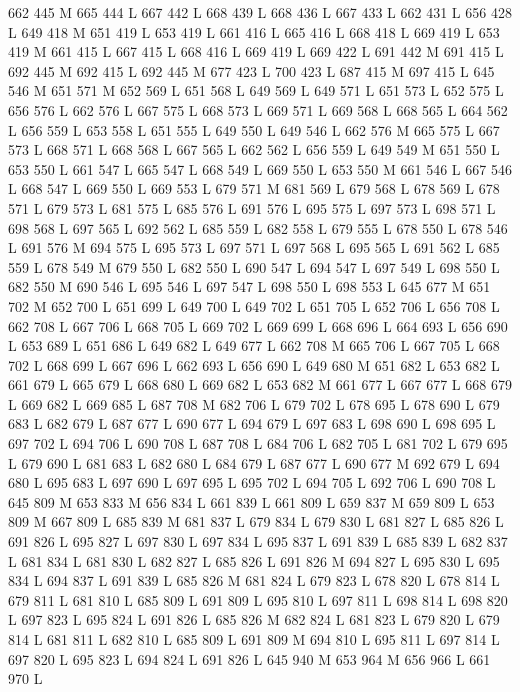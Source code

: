 {{{{{{{{{{{{{{{{{{{{{{{{662 445 M 665 444 L
667 442 L
668 439 L
668 436 L
667 433 L
662 431 L
656 428 L
649 418 M 651 419 L
653 419 L
661 416 L
665 416 L
668 418 L
669 419 L
653 419 M 661 415 L
667 415 L
668 416 L
669 419 L
669 422 L
691 442 M 691 415 L
692 445 M 692 415 L
692 445 M 677 423 L
700 423 L
687 415 M 697 415 L
645 546 M 651 571 M 652 569 L
651 568 L
649 569 L
649 571 L
651 573 L
652 575 L
656 576 L
662 576 L
667 575 L
668 573 L
669 571 L
669 568 L
668 565 L
664 562 L
656 559 L
653 558 L
651 555 L
649 550 L
649 546 L
662 576 M 665 575 L
667 573 L
668 571 L
668 568 L
667 565 L
662 562 L
656 559 L
649 549 M 651 550 L
653 550 L
661 547 L
665 547 L
668 549 L
669 550 L
653 550 M 661 546 L
667 546 L
668 547 L
669 550 L
669 553 L
679 571 M 681 569 L
679 568 L
678 569 L
678 571 L
679 573 L
681 575 L
685 576 L
691 576 L
695 575 L
697 573 L
698 571 L
698 568 L
697 565 L
692 562 L
685 559 L
682 558 L
679 555 L
678 550 L
678 546 L
691 576 M 694 575 L
695 573 L
697 571 L
697 568 L
695 565 L
691 562 L
685 559 L
678 549 M 679 550 L
682 550 L
690 547 L
694 547 L
697 549 L
698 550 L
682 550 M 690 546 L
695 546 L
697 547 L
698 550 L
698 553 L
645 677 M 651 702 M 652 700 L
651 699 L
649 700 L
649 702 L
651 705 L
652 706 L
656 708 L
662 708 L
667 706 L
668 705 L
669 702 L
669 699 L
668 696 L
664 693 L
656 690 L
653 689 L
651 686 L
649 682 L
649 677 L
662 708 M 665 706 L
667 705 L
668 702 L
668 699 L
667 696 L
662 693 L
656 690 L
649 680 M 651 682 L
653 682 L
661 679 L
665 679 L
668 680 L
669 682 L
653 682 M 661 677 L
667 677 L
668 679 L
669 682 L
669 685 L
687 708 M 682 706 L
679 702 L
678 695 L
678 690 L
679 683 L
682 679 L
687 677 L
690 677 L
694 679 L
697 683 L
698 690 L
698 695 L
697 702 L
694 706 L
690 708 L
687 708 L
684 706 L
682 705 L
681 702 L
679 695 L
679 690 L
681 683 L
682 680 L
684 679 L
687 677 L
690 677 M 692 679 L
694 680 L
695 683 L
697 690 L
697 695 L
695 702 L
694 705 L
692 706 L
690 708 L
645 809 M 653 833 M 656 834 L
661 839 L
661 809 L
659 837 M 659 809 L
653 809 M 667 809 L
685 839 M 681 837 L
679 834 L
679 830 L
681 827 L
685 826 L
691 826 L
695 827 L
697 830 L
697 834 L
695 837 L
691 839 L
685 839 L
682 837 L
681 834 L
681 830 L
682 827 L
685 826 L
691 826 M 694 827 L
695 830 L
695 834 L
694 837 L
691 839 L
685 826 M 681 824 L
679 823 L
678 820 L
678 814 L
679 811 L
681 810 L
685 809 L
691 809 L
695 810 L
697 811 L
698 814 L
698 820 L
697 823 L
695 824 L
691 826 L
685 826 M 682 824 L
681 823 L
679 820 L
679 814 L
681 811 L
682 810 L
685 809 L
691 809 M 694 810 L
695 811 L
697 814 L
697 820 L
695 823 L
694 824 L
691 826 L
645 940 M 653 964 M 656 966 L
661 970 L
}}}}}}}}}}}}}}}}}}}}}}}}
